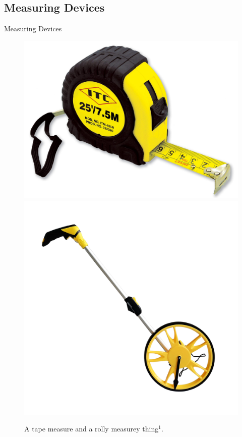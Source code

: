 \documentclass[12pt]{beamer}
\begin{document}
    \subsection{Measuring Devices}
        \begin{frame}{Measuring Devices}
            \begin{figure}
                \includegraphics[scale=0.1]{tapemeasure.jpg}
                \includegraphics[scale=0.5]{rollermeasure.png}
                \caption{A tape measure and a rolly measurey thing$^1$.}
            \end{figure}
        \end{frame}
\end{document}
